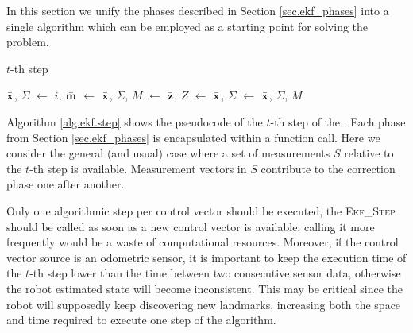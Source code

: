 In this section we unify the phases described in Section \ref{sec.ekf_phases} into a single algorithm which can be employed as a starting point for solving the \SLAM{} problem.

\begin{algorithm}[t]
	\caption{\Ekf{} $t$-th step}
	\label{alg.ekf.step}
	\begin{algorithmic}
		
		\State $\bar{\boldsymbol{\mathrm{{x}}}}$, $\Sigma$ $\gets$ 
		\State $i$, $\bar{\boldsymbol{\mathrm{{m}}}}$ $\gets$ 
		\State $\bar{\boldsymbol{\mathrm{{x}}}}$, $\Sigma$, $M$ $\gets$ 
		\EndIf
		\State $\bar{\boldsymbol{\mathrm{{z}}}}$, $Z$ $\gets$ 
		\State $\bar{\boldsymbol{\mathrm{{x}}}}$, $\Sigma$ $\gets$ 
		\EndFor
		\State \Return $\bar{\boldsymbol{\mathrm{{x}}}}$, $\Sigma$, $M$
		\EndFunction
	\end{algorithmic}
\end{algorithm}

Algorithm \ref{alg.ekf.step} shows the pseudocode of the $t$-th step of the \Ekf{}.
Each phase from Section \ref{sec.ekf_phases} is encapsulated within a function call.
Here we consider the general (and usual) case where a set of measurements $S$ relative to the $t$-th step is available.
Measurement vectors in $S$ contribute to the correction phase one after another.

Only one algorithmic step per control vector should be executed, \ie{} the \textsc{Ekf\_Step} should be called as soon as a new control vector is available: calling it more frequently would be a waste of computational resources.
Moreover, if the control vector source is an odometric sensor, it is important to keep the execution time of the $t$-th step lower than the time between two consecutive sensor data, otherwise the robot estimated state will become inconsistent.
This may be critical since the robot will supposedly keep discovering new landmarks, increasing both the space and time required to execute one step of the algorithm.

